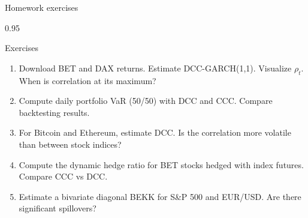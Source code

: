 \documentclass[9pt, aspectratio=169, t]{beamer}
\begin{document}
\begin{frame}{Homework exercises}
    \begin{cminipage}{0.95\textwidth}
    {\footnotesize
    \vspace{-2mm}
    \begin{block}{Exercises}
        \begin{enumerate}\setlength{\itemsep}{1pt}
            \item Download BET and DAX returns. Estimate DCC-GARCH(1,1). Visualize $\rho_t$. When is correlation at its maximum?
            \item Compute daily portfolio VaR (50/50) with DCC and CCC. Compare backtesting results.
            \item For Bitcoin and Ethereum, estimate DCC. Is the correlation more volatile than between stock indices?
            \item Compute the dynamic hedge ratio for BET stocks hedged with index futures. Compare CCC vs DCC.
            \item Estimate a bivariate diagonal BEKK for S\&P 500 and EUR/USD. Are there significant spillovers?
        \end{enumerate}
    \end{block}
    }
    \end{cminipage}
\end{frame}
\end{document}
